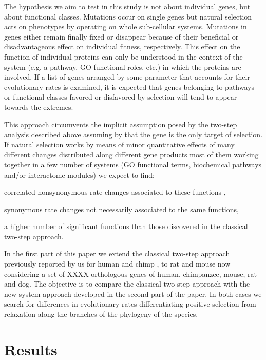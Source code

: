 The hypothesis we aim to test in this study is not about individual genes, but about functional classes. Mutations occur on single genes but natural selection acts on phenotypes by operating on whole sub-cellular systems. Mutations in genes either remain finally fixed or disappear because of their beneficial or disadvantageous effect on individual fitness, respectively. This effect on the function of individual proteins can only be understood in the context of the system (e.g. a pathway, GO functional roles, etc.) in which the proteins are involved. If a list of genes arranged by some parameter that accounts for their evolutionary rates is examined, it is expected that genes belonging to pathways or functional classes favored or disfavored by selection will tend to appear towards the extremes.

This approach circumvents the implicit assumption posed by the two-step analysis described above assuming by that the gene is the only target of selection. If natural selection works by means of minor quantitative effects of many different changes distributed along different gene products most of them working together in a few number of systems (GO functional terms, biochemical pathways and/or interactome modules) we expect to find: \begin{inparaenum}[ 1-] \item correlated nonsynonymous rate changes associated to these functions , \item synonymous rate changes not necessarily associated to the same functions, \item a higher number of significant functions than those discovered in the classical two-step approach.\end{inparaenum}

In the first part of this paper we extend the classical two-step approach previously reported by us for human and chimp \cite{Arbiza2006}, to rat and mouse now considering a set of XXXX orthologous genes of human, chimpanzee, mouse, rat and dog. The objective is to compare the classical two-step approach with the new system approach developed in the second part of the paper. In both cases we search for differences in evolutionary rates differentiating positive selection from relaxation along the branches of the phylogeny of the species.

\section{Results}

